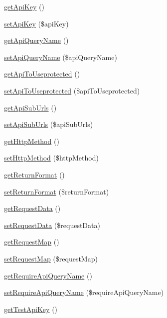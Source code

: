 \begin{DoxyCompactItemize}
\item 
\hyperlink{classCPSApiComponent_afdd5b6b54737f556694975ca3d93d773}{getApiKey} ()
\item 
\hyperlink{classCPSApiComponent_a418ebc2194526fe95a66e1cd6f808fe3}{setApiKey} (\$apiKey)
\item 
\hyperlink{classCPSApiComponent_a62f41a9fb76a981daa867ce583ab0694}{getApiQueryName} ()
\item 
\hyperlink{classCPSApiComponent_aee7fd9023a9ba85260e127060c761508}{setApiQueryName} (\$apiQueryName)
\item 
\hyperlink{classCPSApiComponent_ad3f03754afe9b241f606ce5337d0dde4}{getApiToUseprotected} ()
\item 
\hyperlink{classCPSApiComponent_aac8da7c2f29d0e612e7643c188a90493}{setApiToUseprotected} (\$apiToUseprotected)
\item 
\hyperlink{classCPSApiComponent_aa9cc1a3f709c744893c276647052df7b}{getApiSubUrls} ()
\item 
\hyperlink{classCPSApiComponent_a4613f1c6f82dce6e98baa72135e42266}{setApiSubUrls} (\$apiSubUrls)
\item 
\hyperlink{classCPSApiComponent_a28507580eea1c43f0c9599aa095d09a8}{getHttpMethod} ()
\item 
\hyperlink{classCPSApiComponent_a3504f14e8de18a8fb0794189f097e0e2}{setHttpMethod} (\$httpMethod)
\item 
\hyperlink{classCPSApiComponent_a5a6594548fdca4102f6f27a8fff64b4c}{getReturnFormat} ()
\item 
\hyperlink{classCPSApiComponent_aff4de7b5a1768634443f47b5c7ead556}{setReturnFormat} (\$returnFormat)
\item 
\hyperlink{classCPSApiComponent_aee166055c31ccd75b6d4ac78b22b244c}{getRequestData} ()
\item 
\hyperlink{classCPSApiComponent_ae588dab5917e2d43521a9fdf477e74a2}{setRequestData} (\$requestData)
\item 
\hyperlink{classCPSApiComponent_a4db9ef86c05e67f9b01f4568436b9845}{getRequestMap} ()
\item 
\hyperlink{classCPSApiComponent_a5b1319a13b89df625b519605c2166958}{setRequestMap} (\$requestMap)
\item 
\hyperlink{classCPSApiComponent_ab98fe1e464231f6f2f19350ab2043d28}{getRequireApiQueryName} ()
\item 
\hyperlink{classCPSApiComponent_a373b29a45b2be5fd160067604c03a543}{setRequireApiQueryName} (\$requireApiQueryName)
\item 
\hyperlink{classCPSApiComponent_a408f8531c27a6f76ee849163a36a3eb3}{getTestApiKey} ()

\end{DoxyCompactItemize}
